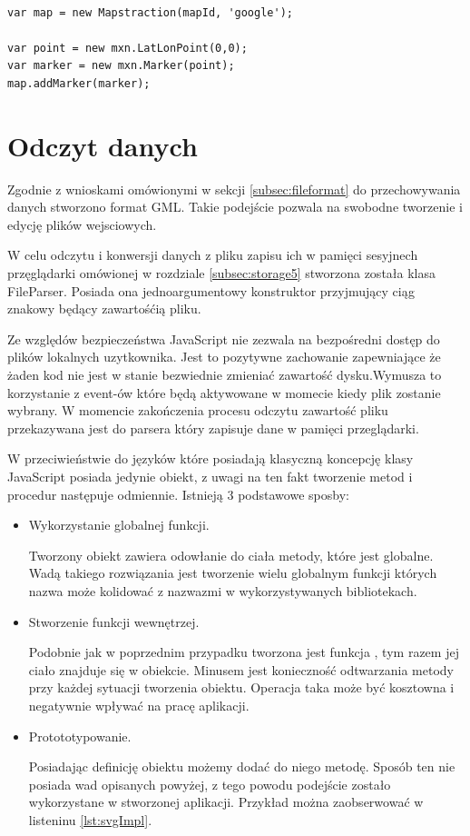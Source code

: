 \lstset{language=JavaScript}
\begin{lstlisting}[label={lst:mapstraction},caption={Wykorzystanie Mapstraction.}]

var map = new Mapstraction(mapId, 'google');

var point = new mxn.LatLonPoint(0,0);
var marker = new mxn.Marker(point);
map.addMarker(marker);

\end{lstlisting}

\section{Odczyt danych}
\label{sec:idata}

Zgodnie z wnioskami omówionymi w sekcji \ref{subsec:fileformat} do przechowywania danych stworzono format GML. Takie podejście pozwala na swobodne tworzenie i edycję plików wejsciowych.

W celu odczytu i konwersji danych z pliku zapisu ich w pamięci sesyjnech przęglądarki omówionej w rozdziale \ref{subsec:storage5} stworzona została klasa FileParser. Posiada ona jednoargumentowy konstruktor przyjmujący ciąg znakowy będący zawartośćią pliku.

Ze względów bezpieczeństwa JavaScript nie zezwala na bezpośredni dostęp do plików lokalnych uzytkownika. Jest to pozytywne zachowanie zapewniające że żaden kod nie jest w stanie bezwiednie zmieniać zawartość dysku.Wymusza to korzystanie z event-ów które będą aktywowane w momecie kiedy plik zostanie wybrany. W momencie zakończenia procesu odczytu zawartość pliku przekazywana jest do parsera który zapisuje dane w pamięci przeglądarki.

W przeciwieństwie do języków które posiadają klasyczną koncepcję klasy JavaScript posiada jedynie obiekt, z uwagi na ten fakt tworzenie metod i procedur następuje odmiennie. Istnieją 3 podstawowe sposby:

\begin{itemize}
\item
Wykorzystanie globalnej funkcji.

Tworzony obiekt zawiera odowłanie do ciała metody, które jest globalne. Wadą takiego rozwiązania jest tworzenie wielu globalnym funkcji których nazwa może kolidować z nazwazmi w wykorzystywanych bibliotekach.
\item
Stworzenie funkcji wewnętrzej. 

Podobnie jak w poprzednim przypadku tworzona jest funkcja , tym razem jej ciało znajduje się w obiekcie. Minusem jest konieczność odtwarzania metody przy każdej sytuacji tworzenia obiektu. Operacja taka może być kosztowna i negatywnie wpływać na pracę aplikacji.
\item
Protototypowanie. 

Posiadając definicję obiektu możemy dodać do niego metodę. Sposób ten nie posiada wad opisanych powyżej, z tego powodu podejście zostało wykorzystane w stworzonej aplikacji. Przykład można zaobserwować w listeninu \ref{lst:svgImpl}.
\end{itemize}


